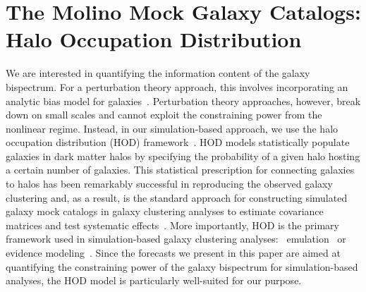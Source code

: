 \section{The Molino Mock Galaxy Catalogs: Halo Occupation Distribution} \label{sec:hod}  
We are interested in quantifying the information content of the galaxy bispectrum. 
For a perturbation theory approach, this involves incorporating an analytic bias model 
for galaxies~\citep[\emph{e.g.}][]{sefusatti2006, yankelevich2019, chudaykin2019}.
Perturbation theory approaches, however, break down on small scales and cannot
exploit the constraining power from the nonlinear regime. Instead, in our simulation-based 
approach, we use the halo occupation distribution (HOD) 
framework~\citep[\emph{e.g.}][]{benson2000, peacock2000, seljak2000,
scoccimarro2001a, berlind2002,
cooray2002, zheng2005, leauthaud2012, tinker2013, zentner2016, vakili2019}.
HOD models statistically populate galaxies in dark matter halos by specifying
the probability of a given halo hosting a certain number of galaxies. This 
statistical prescription for connecting galaxies to halos has been remarkably 
successful in reproducing the observed galaxy clustering and, as a result, is the standard approach for constructing 
simulated galaxy mock catalogs in galaxy clustering analyses to estimate covariance 
matrices and test systematic effects~\citep[\emph{e.g.}][]{rodriguez-torres2016, rodriguez-torres2017, beutler2017}. 
More importantly, HOD is the primary framework used in simulation-based galaxy
clustering analyses: \eg~emulation~\citep{mcclintock2018,
zhai2019} or evidence modeling~\citep{lange2019}. Since the forecasts we
present in this paper are aimed at quantifying the constraining power of the
galaxy bispectrum for simulation-based analyses, the HOD model is particularly 
well-suited for our purpose.

